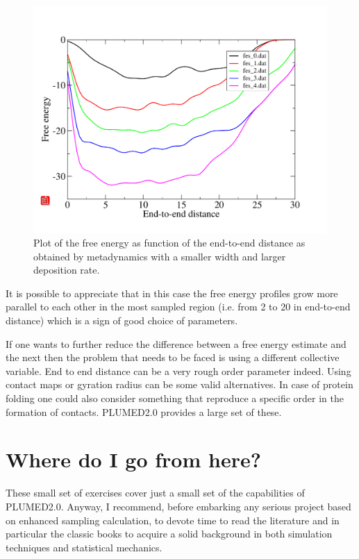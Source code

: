 \documentclass[10pt,fleqn,a4paper]{report}
\begin{document}
\begin{figure}[h!]
\begin{center}
\includegraphics[width=15cm,angle=0]{./figures/free_energy2}
\caption{Plot of the free energy as function of the end-to-end distance as obtained by metadynamics with a smaller width and larger deposition rate.}
\label{free_ene2}
\end{center}
\end{figure} 

It is possible to appreciate that in this case the free energy profiles grow more parallel to each other in the most sampled region (i.e. from 2 to 20 in end-to-end distance) which is a sign of good choice  of parameters. 

If one wants to further reduce the difference between a free energy estimate and the next then the problem that needs to be faced is using a different collective variable. End to end distance can be a very rough order parameter indeed. Using contact maps or gyration radius can be some valid alternatives. In case of protein folding one could also consider something that reproduce a specific order in the  formation of contacts. PLUMED2.0 provides a large set of these.


\chapter{Where do I go from here?}
These small set of exercises cover just a small set of the capabilities of PLUMED2.0. 
Anyway, I recommend, before embarking any serious project based on enhanced sampling calculation, to devote time to read the literature and in particular the classic books
\cite{ALLE87,frenkelsmit,chandler} to acquire a solid background in both simulation techniques and statistical mechanics.
\end{document}

